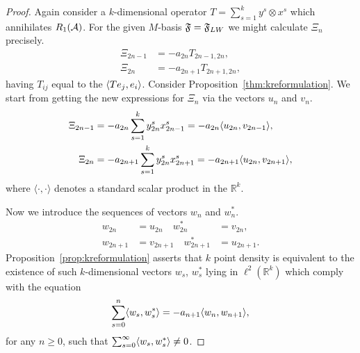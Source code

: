   \begin{proof}
    Again consider a $k$-dimensional operator $T =  \sum_{s=1}^k y^s \otimes x^s$ which annihilates $R_1(\cal{A})$.
    For the given $M$-basis $\fsys = \fsys_{LW}$ we might calculate $\Xi_n$ precisely.
    \begin{align*}
      \Xi_{2n-1} &= -a_{2n}T_{2n - 1, 2n},\\
      \Xi_{2n} &= -a_{2n + 1}T_{2n + 1, 2n},
    \end{align*}
      having $T_{ij}$ equal to the $\inner{Te_j}{e_i}$.
    Consider Proposition~\ref{thm:kreformulation}.
    We start from getting the new expressions for $\Xi_n$ via the vectors $u_n$ and $v_n$.
    \begin{equation}
      \begin{aligned}
        \Xi_{2n-1} &= -a_{2n} \sum_{s=1}^k y^s_{2n} x^s_{2n-1} = -a_{2n} \inner{u_{2n}}{v_{2n-1}},\\
        \Xi_{2n} &= -a_{2n+1} \sum_{s=1}^k y^s_{2n} x^s_{2n+1} = -a_{2n+1} \inner{u_{2n}}{v_{2n+1}},
      \end{aligned}
    \end{equation}
      where $\langle\cdot, \cdot\rangle$ denotes a standard scalar product in the $\mathbb{R}^k$.

    Now we introduce the sequences of vectors $w_n$ and $w^*_n$.
    \begin{align*}
      w_{2n} &= u_{2n} \quad w^*_{2n} &= v_{2n},\\
      w_{2n+1} &= v_{2n+1} \quad w^*_{2n+1} &= u_{2n+1}.
    \end{align*}
    Proposition~\ref{prop:kreformulation} asserts that $k$ point density is equivalent to the existence of
      such $k$-dimensional vectors $w_s$, $w^*_s$ lying in $\ell^2(\mathbb{R}^k)$ which comply with the equation
    \begin{equation}
      \label{eq:vector2}
      \sum_{s=0}^n \inner{w_s}{w^*_s} = -a_{n+1} \inner{w_n}{w_{n+1}},
    \end{equation}
      for any $n \geq 0$, such that $\sum_{s=0}^\infty \inner{w_s}{w^*_s} \neq 0$.


\end{proof}
